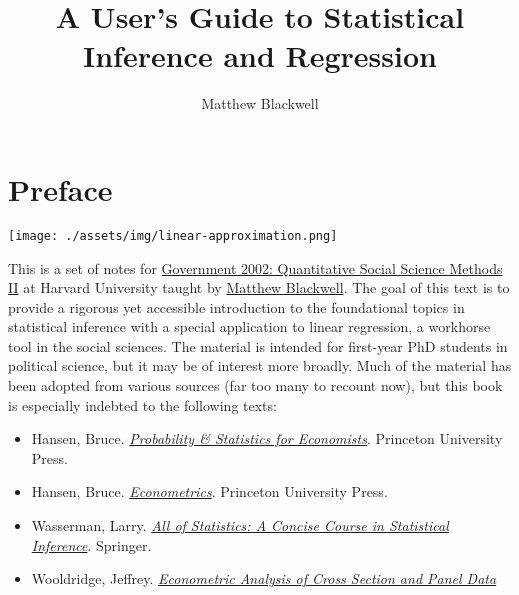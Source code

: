 \documentclass[
  letterpaper,
  DIV=11,
  numbers=noendperiod]{scrreprt}
\title{A User's Guide to Statistical Inference and Regression}
\author{Matthew Blackwell}
\date{}
\providecommand{\tightlist}{%
  \setlength{\itemsep}{0pt}\setlength{\parskip}{0pt}}\usepackage{longtable,booktabs,array}
\renewcommand*\contentsname{Table of contents}
\newcommand\contentsname{Table of contents}
\theoremstyle{definition}
\theoremstyle{plain}
\theoremstyle{definition}
\theoremstyle{remark}
\begin{document}
\maketitle
\ifdefined\Shaded\renewenvironment{Shaded}{\begin{tcolorbox}[borderline west={3pt}{0pt}{shadecolor}, boxrule=0pt, interior hidden, breakable, frame hidden, enhanced, sharp corners]}{\end{tcolorbox}}\fi

\renewcommand*\contentsname{Table of contents}
{
\hypersetup{linkcolor=}
\setcounter{tocdepth}{2}
\tableofcontents
}

\hypertarget{preface}{%
\chapter*{Preface}\label{preface}}


\texttt{[image: ./assets/img/linear-approximation.png]}

This is a set of notes for
\href{https://gov2002.mattblackwell.org}{Government 2002: Quantitative
Social Science Methods II} at Harvard University taught by
\href{https://www.mattblackwell.org}{Matthew Blackwell}. The goal of
this text is to provide a rigorous yet accessible introduction to the
foundational topics in statistical inference with a special application
to linear regression, a workhorse tool in the social sciences. The
material is intended for first-year PhD students in political science,
but it may be of interest more broadly. Much of the material has been
adopted from various sources (far too many to recount now), but this
book is especially indebted to the following texts:

\begin{itemize}
\tightlist
\item
  Hansen, Bruce.
  \href{https://www.amazon.com/Probability-Statistics-Economists-Bruce-Hansen/dp/0691235945/}{\emph{Probability
  \& Statistics for Economists}}. Princeton University Press.
\item
  Hansen, Bruce.
  \href{https://www.amazon.com/Econometrics-Bruce-Hansen/dp/0691235899/}{\emph{Econometrics}}.
  Princeton University Press.
\item
  Wasserman, Larry.
  \href{https://link.springer.com/book/10.1007/978-0-387-21736-9}{\emph{All
  of Statistics: A Concise Course in Statistical Inference}}. Springer.
\item
  Wooldridge, Jeffrey.
  \href{https://mitpress.mit.edu/9780262232586/econometric-analysis-of-cross-section-and-panel-data/}{\emph{Econometric
  Analysis of Cross Section and Panel Data}}
\end{itemize}
\end{document}

